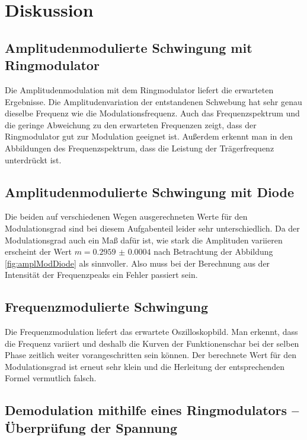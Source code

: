 \section{Diskussion}
\label{sec:Diskussion}

\subsection{Amplitudenmodulierte Schwingung mit Ringmodulator}

Die Amplitudenmodulation mit dem Ringmodulator liefert die erwarteten Ergebnisse. Die Amplitudenvariation der entstandenen Schwebung hat sehr genau dieselbe Frequenz  wie die Modulationsfrequenz. Auch das Frequenzspektrum und die geringe Abweichung zu den erwarteten Frequenzen zeigt, dass der Ringmodulator gut zur Modulation geeignet ist. Außerdem erkennt man in den Abbildungen des Frequenzspektrum, dass die Leistung der Trägerfrequenz unterdrückt ist.

\subsection{Amplitudenmodulierte Schwingung mit Diode}

Die beiden auf verschiedenen Wegen ausgerechneten Werte für den Modulationsgrad sind bei diesem Aufgabenteil leider sehr unterschiedlich. Da der Modulationsgrad auch ein Maß dafür ist, wie stark die Amplituden variieren erscheint der Wert $m = \num{0.2959(4)}$ nach Betrachtung der Abbildung \ref{fig:amplModDiode} als sinnvoller. Also muss bei der Berechnung aus der Intensität der Frequenzpeaks ein Fehler passiert sein.

\subsection{Frequenzmodulierte Schwingung}

Die Frequenzmodulation liefert das erwartete Oszilloskopbild. Man erkennt, dass die Frequenz variiert und deshalb die Kurven der Funktionenschar bei der selben Phase zeitlich weiter vorangeschritten sein können.
Der berechnete Wert für den Modulationsgrad ist erneut sehr klein und die Herleitung der entsprechenden Formel vermutlich falsch.

\subsection{Demodulation mithilfe eines Ringmodulators -- Überprüfung der Spannung}

